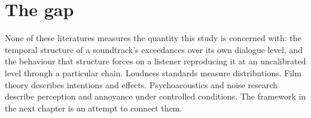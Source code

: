 \section{The gap}

None of these literatures measures the quantity this study is concerned with: the temporal structure of a soundtrack's exceedances over its own dialogue level, and the behaviour that structure forces on a listener reproducing it at an uncalibrated level through a particular chain. Loudness standards measure distributions. Film theory describes intentions and effects. Psychoacoustics and noise research describe perception and annoyance under controlled conditions. The framework in the next chapter is an attempt to connect them.
